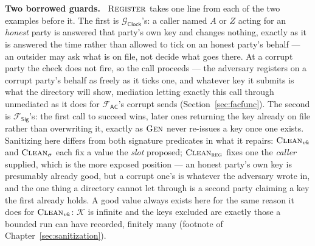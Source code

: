 \documentclass[10pt,oneside,openany]{book}
\newcommand{\op}[1]{\textnormal{\textsc{#1}}}
\newcommand{\Fsig}{\mathcal{F}_{\mathsf{Sig}}}
\newcommand{\Gclock}{\mathcal{G}_{\mathsf{Clock}}}
\newcommand{\Fac}{\mathcal{F}_{\mathsf{AC}}}
\newcommand{\vk}{\mathit{vk}}
\newcommand{\Keys}{\mathcal{K}}
\newcommand{\Clean}{\op{Clean}}
\newcommand{\heading}[1]{\medskip\par\noindent\textcolor{accent}{\textbf{#1.}}\ }
\theoremstyle{accentdef}
\theoremstyle{accentplain}
\begin{document}
\heading{Two borrowed guards} $\op{Register}$ takes one line from each of the two examples before
it. The first is $\Gclock$'s: a caller named $A$ or $Z$ acting for an \emph{honest} party is
answered that party's own key and changes nothing, exactly as it is answered the time rather than
allowed to tick on an honest party's behalf --- an outsider may ask what is on file, not decide
what goes there. At a corrupt party the check does not fire, so the call proceeds --- the adversary
registers on a corrupt party's behalf as freely as it ticks one, and whatever key it submits is
what the directory will show, mediation letting exactly this call through unmediated as it does
for $\Fac$'s corrupt sends (Section~\ref{sec:facfunc}). The second is $\Fsig$'s: the first call to
succeed wins, later ones returning the key already on file rather than overwriting it, exactly as
$\op{Gen}$ never re-issues a key once one exists. Sanitizing here differs from both signature
predicates in what it repairs: $\Clean_{\vk}$ and $\Clean_{\sigma}$ each fix a value the \emph{slot}
proposed; $\Clean_{\op{reg}}$ fixes one the \emph{caller} supplied, which is the more exposed
position --- an honest party's own key is presumably already good, but a corrupt one's is whatever
the adversary wrote in, and the one thing a directory cannot let through is a second party
claiming a key the first already holds. A good value always exists here for the same reason it
does for $\Clean_{\vk}$: $\Keys$ is infinite and the keys excluded are exactly those a bounded run
can have recorded, finitely many (footnote of Chapter~\ref{sec:sanitization}).
\end{document}
